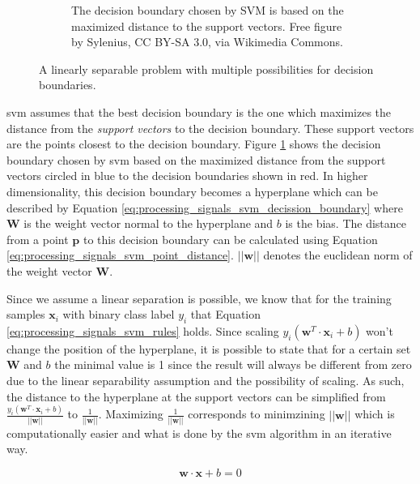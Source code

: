 \begin{figure}[t]
\begin{subfigure}{0.45\textwidth}
        \captionsetup{width=\linewidth}
        \captionsetup{justification=centering}
        \caption{The decision boundary chosen by SVM is based on the maximized distance to the support vectors. Free figure by Sylenius, CC BY-SA 3.0, via Wikimedia Commons.}
        \label{fig:processing_signals_svm_boundary_best}
    \end{subfigure}
    \captionsetup{width=\linewidth}
    \captionsetup{justification=centering}
    \caption{A linearly separable problem with multiple possibilities for decision boundaries.}
    \label{fig:processing_signals_svm_boundary}
\end{figure}


\Gls{svm} assumes that the best decision boundary is the one which maximizes the distance from the \textit{support vectors} to the decision boundary.
These support vectors are the points closest to the decision boundary.
Figure \ref{fig:processing_signals_svm_boundary_best} shows the decision boundary chosen by \gls{svm} based on the maximized distance from the support vectors circled in blue to the decision boundaries shown in red.
In higher dimensionality, this decision boundary becomes a hyperplane which can be described by Equation \ref{eq:processing_signals_svm_decission_boundary} where $\mathbf{W}$ is the weight vector normal to the hyperplane and $b$ is the bias.
The distance from a point $\mathbf{p}$ to this decision boundary can be calculated using Equation \ref{eq:processing_signals_svm_point_distance}.
$||\mathbf{w}||$ denotes the euclidean norm of the weight vector $\mathbf{W}$.

Since we assume a linear separation is possible, we know that for the training samples $\mathbf{x}_i$ with binary class label $y_i$ that Equation \ref{eq:processing_signals_svm_rules} holds.
Since scaling $y_i (\mathbf{w}^T \cdot \mathbf{x}_i + b)$ won't change the position of the hyperplane, it is possible to state that for a certain set $\mathbf{W}$ and $b$ the minimal value is 1 since the result will always be different from zero due to the linear separability assumption and the possibility of scaling.
As such, the distance to the hyperplane at the support vectors can be simplified from $\frac{y_i (\mathbf{w}^T \cdot \mathbf{x}_i + b)}{||\mathbf{w}||}$ to $\frac{1}{||\mathbf{w}||}$.
Maximizing $\frac{1}{||\mathbf{w}||}$ corresponds to minimzining $||\mathbf{w}||$ which is computationally easier and what is done by the \gls{svm} algorithm in an iterative way.


\begin{equation}
    \label{eq:processing_signals_svm_decission_boundary}
    \mathbf{w} \cdot \mathbf{x} + b = 0
\end{equation}

